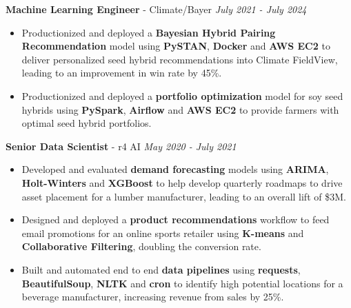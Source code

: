 \documentclass[hidelinks, 10pt, A4]{article} %
\begin{document}
\medskip

\noindent{\Large \textcolor{sectcol}{Professional Experience}} \medskip

\noindent \centerline{\large \textbf{Machine Learning Engineer} \textcolor{bgcol}{ - Climate/Bayer}
\hfill \it July 2021 - July 2024}
\begin{itemize}
  \item Productionized and deployed a \textbf{Bayesian Hybrid Pairing Recommendation} model using \textbf{PySTAN}, \textbf{Docker} and \textbf{AWS EC2} to deliver personalized seed hybrid recommendations into Climate FieldView, leading to an improvement in win rate by 45\%.
  \item Productionized and deployed a \textbf{portfolio optimization} model for soy seed hybrids using \textbf{PySpark}, \textbf{Airflow} and \textbf{AWS EC2} to provide farmers with optimal seed hybrid portfolios.
\end{itemize}

\medskip

\noindent \centerline{\large \textbf{Senior Data Scientist} \textcolor{bgcol}{ - r4 AI}
\hfill \it May 2020 - July 2021}
\begin{itemize}
  \item Developed and evaluated \textbf{demand forecasting} models using \textbf{ARIMA}, \textbf{Holt-Winters} and \textbf{XGBoost} to help develop quarterly roadmaps to drive asset placement for a lumber manufacturer, leading to an overall lift of \$3M.
  \item Designed and deployed a \textbf{product recommendations} workflow to feed email promotions for an online sports retailer using \textbf{K-means} and \textbf{Collaborative Filtering}, doubling the conversion rate.
  \item Built and automated end to end \textbf{data pipelines} using \textbf{requests}, \textbf{BeautifulSoup}, \textbf{NLTK} and \textbf{cron} to identify high potential locations for a beverage manufacturer, increasing revenue from sales by 25\%.
\end{itemize}
\end{document}
